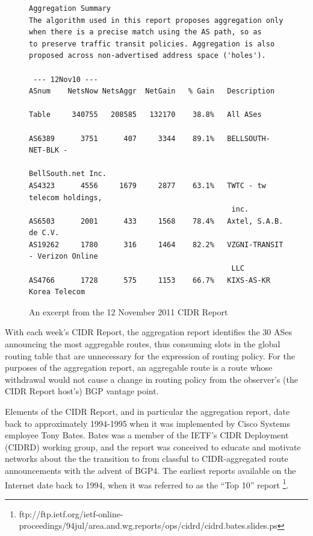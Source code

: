 \begin{figure}
\begin{lstlisting}[frame=trlb]
Aggregation Summary
The algorithm used in this report proposes aggregation only
when there is a precise match using the AS path, so as 
to preserve traffic transit policies. Aggregation is also
proposed across non-advertised address space ('holes').

 --- 12Nov10 ---
ASnum    NetsNow NetsAggr  NetGain   % Gain   Description

Table     340755   208585   132170    38.8%   All ASes

AS6389      3751      407     3344    89.1%   BELLSOUTH-NET-BLK -
                                               BellSouth.net Inc.
AS4323      4556     1679     2877    63.1%   TWTC - tw telecom holdings,
                                               inc.
AS6503      2001      433     1568    78.4%   Axtel, S.A.B. de C.V.
AS19262     1780      316     1464    82.2%   VZGNI-TRANSIT - Verizon Online
                                               LLC
AS4766      1728      575     1153    66.7%   KIXS-AS-KR Korea Telecom
\end{lstlisting}
\caption{An excerpt from the 12 November 2011 CIDR Report}
\label{fig:ex_cidr_report}
\end{figure}

With each week's CIDR Report, the aggregation report identifies the 30 ASes announcing the most aggregable routes, thus consuming slots in the global routing table that are unnecessary for the expression of routing policy. For the purposes of the aggregation report, an aggregable route is a route whose withdrawal would not cause a change in routing policy from the observer's (the CIDR Report host's) BGP vantage point.

Elements of the CIDR Report, and in particular the aggregation report, date back to approximately 1994-1995 when it was implemented by Cisco Systems employee Tony Bates. Bates was a member of the IETF's CIDR Deployment (CIDRD) working group, and the report was conceived to educate and motivate networks about the the transition to from classful to CIDR-aggregated route announcements with the advent of BGP4. The earliest reports available on the Internet date back to 1994, when it was referred to as the ``Top 10'' report \footnote{ftp://ftp.ietf.org/ietf-online-proceedings/94jul/area.and.wg.reports/ops/cidrd/cidrd.bates.slides.ps}.

